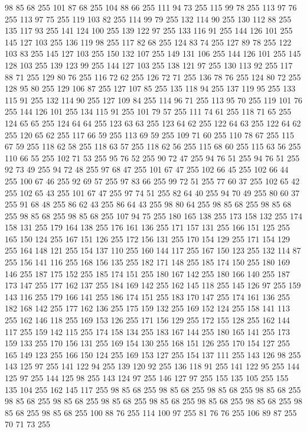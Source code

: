 98 85 68 255 101 87 68 255 104 88 66 255 111 94 73 255 115 99 78 255 113 97 76 255 113 97 75 255 119 103 82 255 114 99 79 255 132 114 90 255 130 112 88 255 135 117 93 255 141 124 100 255 139 122 97 255 133 116 91 255 144 126 101 255 145 127 103 255 136 119 98 255 117 82 68 255 124 83 74 255 127 89 78 255 122 103 83 255 145 127 103 255 150 132 107 255 149 131 106 255 144 126 101 255 145 128 103 255 139 123 99 255 144 127 103 255 138 121 97 255 130 113 92 255 117 88 71 255 129 80 76 255 116 72 62 255 126 72 71 255 136 78 76 255 124 80 72 255 128 95 80 255 129 106 87 255 127 107 85 255 135 118 94 255 137 119 95 255 133 115 91 255 132 114 90 255 127 109 84 255 114 96 71 255 113 95 70 255 119 101 76 255 144 126 101 255 134 115 91 255 101 79 57 255 111 74 61 255 118 71 65 255 124 65 65 255 124 64 64 255 123 63 63 255 123 64 62 255 122 64 63 255 122 64 62 255 120 65 62 255 117 66 59 255 113 69 59 255 109 71 60 255 110 78 67 255
115 67 59 255 118 62 58 255 118 63 57 255 118 62 56 255 115 68 60 255 115 63 56 255 110 66 55 255 102 71 53 255 95 76 52 255 90 72 47 255 94 76 51 255 94 76 51 255 92 73 49 255 94 72 48 255 97 68 47 255 101 67 47 255 102 66 45 255 102 66 44 255 100 67 46 255 92 69 57 255 97 83 66 255 99 72 51 255 77 60 37 255 102 65 42 255 102 65 43 255 101 67 47 255 97 74 51 255 82 64 40 255 94 70 49 255 80 60 37 255 91 68 48 255 86 62 43 255 86 64 43 255 98 80 64 255 98 85 68 255 98 85 68 255 98 85 68 255 98 85 68 255 107 94 75 255 180 165 138 255 173 158 132 255 174 158 131 255 179 164 138 255 176 161 136 255 171 157 131 255 166 151 125 255 165 150 124 255 167 151 126 255 172 156 131 255 170 154 129 255 171 154 129 255 164 148 121 255 154 137 110 255 160 144 117 255 167 150 123 255 132 114 87 255 156 141 116 255 168 156 135 255 182 171 148 255 185 174 150 255 180 169 146 255 187 175 152 255 185 174 151 255 180 167 142 255
180 166 140 255 187 173 147 255 177 162 137 255 184 169 142 255 162 145 118 255 145 126 97 255 159 143 116 255 179 166 141 255 186 174 151 255 183 170 147 255 174 161 136 255 182 168 142 255 177 162 136 255 175 159 132 255 169 152 124 255 158 141 113 255 162 146 118 255 169 153 126 255 171 156 129 255 172 155 128 255 162 144 117 255 159 142 115 255 174 158 134 255 183 167 144 255 180 165 141 255 173 159 133 255 170 156 131 255 169 154 130 255 168 151 126 255 170 154 127 255 165 149 123 255 166 150 124 255 169 153 127 255 154 137 111 255 143 126 98 255 143 125 97 255 141 122 94 255 139 120 92 255 136 118 91 255 141 122 95 255 144 125 97 255 144 125 98 255 143 124 97 255 146 127 97 255 155 135 105 255 155 135 104 255 162 145 117 255 98 85 68 255 98 85 68 255 98 85 68 255 98 85 68 255 98 85 68 255 98 85 68 255 98 85 68 255 98 85 68 255 98 85 68 255 98 85 68 255 98 85 68 255 98 85 68 255 100 88 76 255 114 100 97 255 81 76 76 255 106 89 87 255 70 71 73 255
